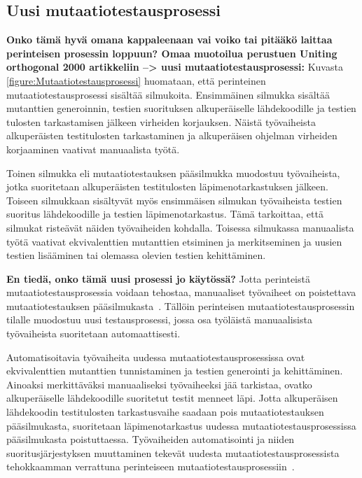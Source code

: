\documentclass[finnish, grading]{tktltiki2}
\theoremstyle{definition}
\theoremstyle{remark}
\begin{document}
\subsection{Uusi mutaatiotestausprosessi}

\textbf{Onko tämä hyvä omana kappaleenaan vai voiko tai pitääkö laittaa perinteisen prosessin loppuun? Omaa muotoilua perustuen Uniting orthogonal 2000 artikkeliin --> uusi mutaatiotestausprosessi:} Kuvasta \ref{figure:Mutaatiotestausprosessi} huomataan, että perinteinen mutaatiotestausprosessi sisältää silmukoita. Ensimmäinen silmukka sisältää mutanttien generoinnin, testien suorituksen alkuperäiselle lähdekoodille ja testien tulosten tarkastamisen jälkeen virheiden korjauksen. Näistä työvaiheista alkuperäisten testitulosten tarkastaminen ja alkuperäisen ohjelman virheiden korjaaminen vaativat manuaalista työtä.

Toinen silmukka eli mutaatiotestauksen pääsilmukka muodostuu työvaiheista, jotka suoritetaan alkuperäisten testitulosten läpimenotarkastuksen jälkeen. Toiseen silmukkaan sisältyvät myös ensimmäisen silmukan työvaiheista testien suoritus lähdekoodille ja testien läpimenotarkastus. Tämä tarkoittaa, että silmukat risteävät näiden työvaiheiden kohdalla. Toisessa silmukassa manuaalista työtä vaativat ekvivalenttien mutanttien etsiminen ja merkitseminen ja uusien testien lisääminen tai olemassa olevien testien kehittäminen.

\textbf{En tiedä, onko tämä uusi prosessi jo käytössä?} Jotta perinteistä mutaatiotestausprosessia voidaan tehostaa, manuaaliset työvaiheet on poistettava mutaatiotestauksen pääsilmukasta~\cite[s. 41]{Offutt:Untch:2001}. Tällöin perinteisen mutaatiotestausprosessin tilalle muodostuu uusi testausprosessi, jossa osa työläistä manuaalisista työvaiheista suoritetaan automaattisesti. 

Automatisoitavia työvaiheita uudessa mutaatiotestausprosessissa ovat ekvivalenttien mutanttien tunnistaminen ja testien generointi ja kehittäminen. Ainoaksi merkittäväksi manuaaliseksi työvaiheeksi jää tarkistaa, ovatko alkuperäiselle lähdekoodille suoritetut testit menneet läpi. Jotta alkuperäisen lähdekoodin testitulosten tarkastusvaihe saadaan pois mutaatiotestauksen pääsilmukasta, suoritetaan läpimenotarkastus uudessa mutaatiotestausprosessissa pääsilmukasta poistuttaessa. Työvaiheiden automatisointi ja niiden suoritusjärjestyksen muuttaminen tekevät uudesta mutaatiotestausprosessista tehokkaamman verrattuna perinteiseen mutaatiotestausprosessiin~\cite[s. 41]{Offutt:Untch:2001}.
\end{document}
